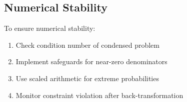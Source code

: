 \documentclass[11pt]{article}
\begin{document}
\subsection{Numerical Stability}

To ensure numerical stability:
\begin{enumerate}
    \item Check condition number of condensed problem
    \item Implement safeguards for near-zero denominators
    \item Use scaled arithmetic for extreme probabilities
    \item Monitor constraint violation after back-transformation
\end{enumerate}
\end{document}
